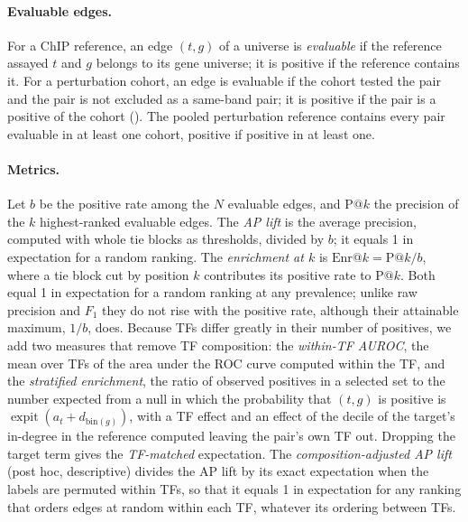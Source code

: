 \paragraph{Evaluable edges.}
For a ChIP reference, an edge $(t,g)$ of a universe is \emph{evaluable} if the reference assayed $t$ and $g$ belongs to its gene universe; it is positive if the reference contains it.
For a perturbation cohort, an edge is evaluable if the cohort tested the pair and the pair is not excluded as a same-band pair; it is positive if the pair is a positive of the cohort ().
The pooled perturbation reference contains every pair evaluable in at least one cohort, positive if positive in at least one.

\paragraph{Metrics.}
Let $b$ be the positive rate among the $N$ evaluable edges, and $\mathrm{P}@k$ the precision of the $k$ highest-ranked evaluable edges.
The \emph{AP lift} is the average precision, computed with whole tie blocks as thresholds, divided by $b$; it equals 1 in expectation for a random ranking.
The \emph{enrichment at $k$} is $\mathrm{Enr}@k=\mathrm{P}@k/b$, where a tie block cut by position $k$ contributes its positive rate to $\mathrm{P}@k$.
Both equal 1 in expectation for a random ranking at any prevalence; unlike raw precision and $F_1$ they do not rise with the positive rate, although their attainable maximum, $1/b$, does.
Because TFs differ greatly in their number of positives, we add two measures that remove TF composition: the \emph{within-TF AUROC}, the mean over TFs of the area under the ROC curve computed within the TF, and the \emph{stratified enrichment}, the ratio of observed positives in a selected set to the number expected from a null in which the probability that $(t,g)$ is positive is $\operatorname{expit}(a_t+d_{\mathrm{bin}(g)})$, with a TF effect and an effect of the decile of the target's in-degree in the reference computed leaving the pair's own TF out. Dropping the target term gives the \emph{TF-matched} expectation.
The \emph{composition-adjusted AP lift} (post hoc, descriptive) divides the AP lift by its exact expectation when the labels are permuted within TFs, so that it equals 1 in expectation for any ranking that orders edges at random within each TF, whatever its ordering between TFs.

